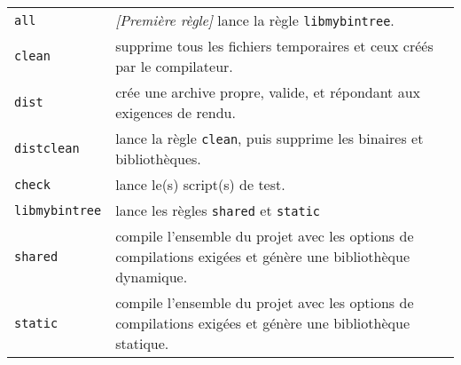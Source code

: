 \bigskip

\begin{table}
\begin{tabular}{l p{12cm}}
\texttt{all} & \textit{[Première règle]} lance la règle \texttt{libmybintree}.\\
\texttt{clean} & supprime tous les fichiers temporaires et ceux créés par le compilateur.\\
\texttt{dist} & crée une archive propre, valide, et répondant aux exigences de rendu.\\
\texttt{distclean} & lance la règle \texttt{clean}, puis supprime les binaires et bibliothèques.\\
\texttt{check} & lance le(s) script(s) de test.\\
\texttt{libmybintree} & lance les règles \texttt{shared} et \texttt{static} \\
\texttt{shared} & compile l'ensemble du projet avec les options de compilations exigées et génère une bibliothèque dynamique.\\
\texttt{static} & compile l'ensemble du projet avec les options de compilations exigées et génère une bibliothèque statique.\\
\end{tabular}
\end{table}

\phantom{42}

\vfillFirst

\vfillLast
